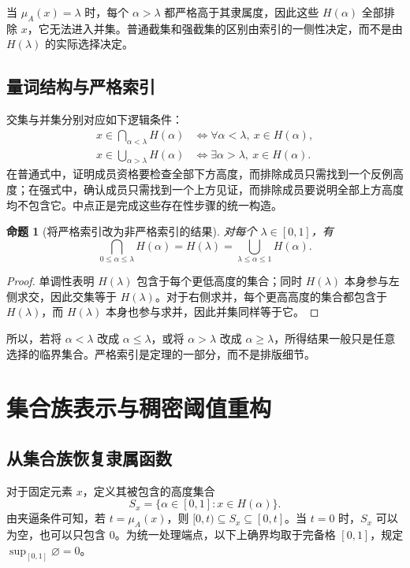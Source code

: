 \documentclass[UTF8,fontset=fandol,zihao=-4,a4paper]{ctexart}
\numberwithin{equation}{section}
\theoremstyle{reportplain}
\newtheorem{proposition}[theorem]{命题}
\newcommand{\muA}{\mu_A}
\newcommand{\set}[1]{\{#1\}}
\newcommand{\eqtag}[1]{\label{#1}}
\begin{document}
当 $\muA(x)=\lambda$ 时，每个 $\alpha>\lambda$ 都严格高于其隶属度，因此这些 $H(\alpha)$ 全部排除 $x$，它无法进入并集。普通截集和强截集的区别由索引的一侧性决定，而不是由 $H(\lambda)$ 的实际选择决定。

\subsection{量词结构与严格索引}
交集与并集分别对应如下逻辑条件：
\begin{align}
x\in\bigcap_{\alpha<\lambda}H(\alpha)
&\iff\forall\alpha<\lambda,\ x\in H(\alpha),\eqtag{eq:forall}\\
x\in\bigcup_{\alpha>\lambda}H(\alpha)
&\iff\exists\alpha>\lambda,\ x\in H(\alpha).\eqtag{eq:exists}
\end{align}
在普通式中，证明成员资格要检查全部下方高度，而排除成员只需找到一个反例高度；在强式中，确认成员只需找到一个上方见证，而排除成员要说明全部上方高度均不包含它。中点正是完成这些存在性步骤的统一构造。

\begin{proposition}[将严格索引改为非严格索引的结果]
对每个 $\lambda\in[0,1]$，有
\begin{equation}
\bigcap_{0\le\alpha\le\lambda}H(\alpha)=H(\lambda)
=\bigcup_{\lambda\le\alpha\le1}H(\alpha).
\eqtag{eq:inclusive}
\end{equation}
\end{proposition}
\begin{proof}
单调性表明 $H(\lambda)$ 包含于每个更低高度的集合；同时 $H(\lambda)$ 本身参与左侧求交，因此交集等于 $H(\lambda)$。对于右侧求并，每个更高高度的集合都包含于 $H(\lambda)$，而 $H(\lambda)$ 本身也参与求并，因此并集同样等于它。\end{proof}
所以，若将 $\alpha<\lambda$ 改成 $\alpha\le\lambda$，或将 $\alpha>\lambda$ 改成 $\alpha\ge\lambda$，所得结果一般只是任意选择的临界集合。严格索引是定理的一部分，而不是排版细节。

\section{集合族表示与稠密阈值重构}
\subsection{从集合族恢复隶属函数}
对于固定元素 $x$，定义其被包含的高度集合
\begin{equation}
S_x=\set{\alpha\in[0,1]:x\in H(\alpha)}.
\eqtag{eq:sx}
\end{equation}
由夹逼条件可知，若 $t=\muA(x)$，则 $[0,t)\subseteq S_x\subseteq[0,t]$。当 $t=0$ 时，$S_x$ 可以为空，也可以只包含 0。为统一处理端点，以下上确界均取于完备格 $[0,1]$，规定 $\sup_{[0,1]}\varnothing=0$。
\end{document}
